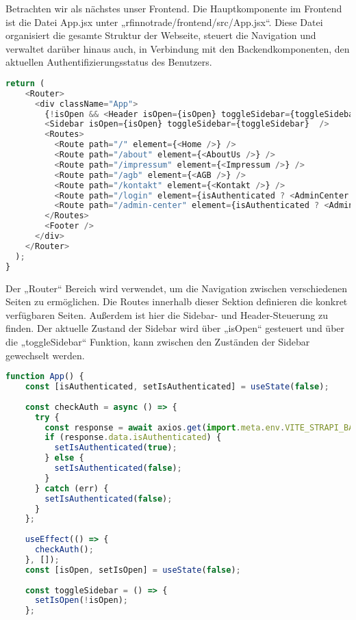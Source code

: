 Betrachten wir als nächstes unser Frontend. Die Hauptkomponente im Frontend ist die Datei App.jsx unter „rfinnotrade/frontend/src/App.jsx“. Diese Datei organisiert die gesamte Struktur der Webseite, steuert die Navigation und verwaltet darüber hinaus auch, in Verbindung mit den Backendkomponenten, den aktuellen Authentifizierungsstatus des Benutzers.

\begin{lstlisting}[language=JavaScript, caption={App.jsx Router}, label={lst:appjsxRouter}]
return (
    <Router>
      <div className="App">
        {!isOpen && <Header isOpen={isOpen} toggleSidebar={toggleSidebar} isAuthenticated={isAuthenticated} setIsAuthenticated={setIsAuthenticated} />}
        <Sidebar isOpen={isOpen} toggleSidebar={toggleSidebar}  />
        <Routes>
          <Route path="/" element={<Home />} />
          <Route path="/about" element={<AboutUs />} />
          <Route path="/impressum" element={<Impressum />} />
          <Route path="/agb" element={<AGB />} />
          <Route path="/kontakt" element={<Kontakt />} />
          <Route path="/login" element={isAuthenticated ? <AdminCenter /> : <Login onLoginSuccess={checkAuth} />} />
          <Route path="/admin-center" element={isAuthenticated ? <AdminCenter /> : <Login onLoginSuccess={checkAuth} />} />
        </Routes>
        <Footer />
      </div>
    </Router>
  );
}
\end{lstlisting}

Der „Router“ Bereich wird verwendet, um die Navigation zwischen verschiedenen Seiten zu ermöglichen. Die Routes innerhalb dieser Sektion definieren die konkret verfügbaren Seiten.
Außerdem ist hier die Sidebar- und Header-Steuerung zu finden. Der aktuelle Zustand der Sidebar wird über „isOpen“ gesteuert und über die „toggleSidebar“ Funktion, kann zwischen den Zuständen der Sidebar gewechselt werden.

\begin{lstlisting}[language=JavaScript, caption={App.jsx checkAuth}, label={lst:appjsxCheckAuth}]    
function App() {
    const [isAuthenticated, setIsAuthenticated] = useState(false);
  
    const checkAuth = async () => {
      try {
        const response = await axios.get(import.meta.env.VITE_STRAPI_BASE_URL + 'api/auth/status', { withCredentials: true });
        if (response.data.isAuthenticated) {
          setIsAuthenticated(true);
        } else {
          setIsAuthenticated(false);
        }
      } catch (err) {
        setIsAuthenticated(false);
      }
    };
  
    useEffect(() => {
      checkAuth();
    }, []);
    const [isOpen, setIsOpen] = useState(false);
  
    const toggleSidebar = () => {
      setIsOpen(!isOpen);
    };
\end{lstlisting}


